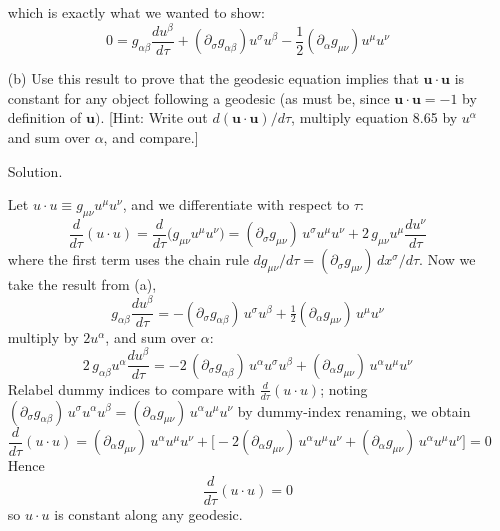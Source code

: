 \documentclass[12pt]{article}
\begin{document}
\begin{enumerate}
which is exactly what we wanted to show:
\[
\boxed{\;
0=g_{\alpha \beta}\frac{d u^\beta}{d \tau}
+\left(\partial_\sigma g_{\alpha \beta}\right) u^\sigma u^\beta
-\frac{1}{2}\left(\partial_\alpha g_{\mu \nu}\right) u^\mu u^\nu
\; }
\]

  \item[(b)] Use this result to prove that the geodesic equation implies that $\boldsymbol{u} \cdot \boldsymbol{u}$ is constant for any object following a geodesic (as must be, since $\boldsymbol{u} \cdot \boldsymbol{u}=-1$ by definition of $\boldsymbol{u})$. [Hint: Write out $d(\boldsymbol{u} \cdot \boldsymbol{u}) / d \tau$, multiply equation 8.65 by $u^\alpha$ and sum over $\alpha$, and compare.]
  
  \item[Solution.]
  
  Let $u\!\cdot\!u \equiv g_{\mu\nu}u^\mu u^\nu$, and we differentiate with respect to $\tau$:
\[
\frac{d}{d\tau}(u\!\cdot\!u)
= \frac{d}{d\tau}\big(g_{\mu\nu}u^\mu u^\nu\big)
= (\partial_\sigma g_{\mu\nu})\,u^\sigma u^\mu u^\nu
  + 2\,g_{\mu\nu}u^\mu\frac{d u^\nu}{d\tau}
\]
where the first term uses the chain rule $dg_{\mu\nu}/d\tau=(\partial_\sigma g_{\mu\nu})\,dx^\sigma/d\tau$. Now we take the result from (a),
\[
g_{\alpha\beta}\frac{d u^\beta}{d\tau}
= -(\partial_\sigma g_{\alpha\beta})\,u^\sigma u^\beta
  + \tfrac12(\partial_\alpha g_{\mu\nu})\,u^\mu u^\nu
\]
multiply by $2u^\alpha$, and sum over $\alpha$:
\[
2\,g_{\alpha\beta}u^\alpha\frac{d u^\beta}{d\tau}
= -2\,(\partial_\sigma g_{\alpha\beta})\,u^\alpha u^\sigma u^\beta
  + (\partial_\alpha g_{\mu\nu})\,u^\alpha u^\mu u^\nu
\]
Relabel dummy indices to compare with $\frac{d}{d\tau}(u\!\cdot\!u)$; noting
\(
(\partial_\sigma g_{\alpha\beta})\,u^\sigma u^\alpha u^\beta
= (\partial_\alpha g_{\mu\nu})\,u^\alpha u^\mu u^\nu
\)
by dummy-index renaming, we obtain
\[
\frac{d}{d\tau}(u\!\cdot\!u)
= (\partial_\alpha g_{\mu\nu})\,u^\alpha u^\mu u^\nu
  + \Big[-2(\partial_\alpha g_{\mu\nu})\,u^\alpha u^\mu u^\nu
         + (\partial_\alpha g_{\mu\nu})\,u^\alpha u^\mu u^\nu\Big]
= 0
\]
Hence
\[
\boxed{\;\frac{d}{d\tau}(u\!\cdot\!u)=0\;}
\]
so $u\!\cdot\!u$ is constant along any geodesic.

\end{enumerate}
\newpage%
\end{document}
